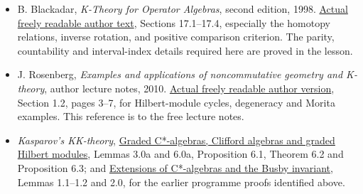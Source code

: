 \documentclass[
  11pt,
]{article}
\begin{document}
\begin{itemize}
\item
  B. Blackadar, \emph{K-Theory for Operator Algebras}, second edition,
  1998.
  \href{https://www.bruceblackadar.com/Mathematics/book6.pdf}{Actual
  freely readable author text}, Sections 17.1--17.4, especially the
  homotopy relations, inverse rotation, and positive comparison
  criterion. The parity, countability and interval-index details
  required here are proved in the lesson.
\item
  J. Rosenberg, \emph{Examples and applications of noncommutative
  geometry and K-theory}, author lecture notes, 2010.
  \href{https://math.umd.edu/~jmr/BuenosAires/NCGexamples.pdf}{Actual
  freely readable author version}, Section 1.2, pages 3--7, for
  Hilbert-module cycles, degeneracy and Morita examples. This reference
  is to the free lecture notes.
\item
  \emph{Kasparov's KK-theory}, \href{KT-KK-05.html}{Graded C*-algebras,
  Clifford algebras and graded Hilbert modules}, Lemmas 3.0a and 6.0a,
  Proposition 6.1, Theorem 6.2 and Proposition 6.3; and
  \href{KT-KK-01.html}{Extensions of C*-algebras and the Busby
  invariant}, Lemmas 1.1--1.2 and 2.0, for the earlier programme proofs
  identified above.
\end{itemize}
\end{document}

